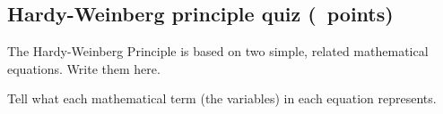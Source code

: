 \documentclass[11pt, addpoints]{exam}
\begin{document}
\subsection*{Hardy-Weinberg principle quiz (\numpoints\ points)}

\begin{questions}

%

\question[2]
The Hardy-Weinberg Principle is based on two simple, related
mathematical equations. Write them here. 

\bigskip

\question [5]
Tell what each mathematical term (the variables) in each equation represents.
\end{questions}
\end{document}
